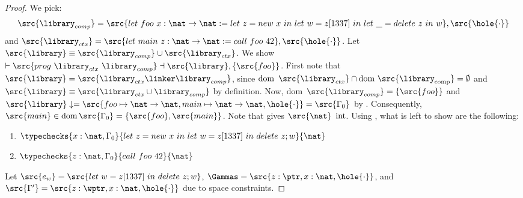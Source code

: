 \documentclass[a4paper,names,dvipsnames]{article}
\begin{document}
\label{thm:lms:notspatmemsafe}
\begin{proof}
  We pick:
  $$\src{\library_{comp}} = \src{let\ foo\ x:\nat\to\nat:=let\ z=new\ x\ in\ let\ w = z[1337]\ in\ let\ \_ = delete\ z\ in\ w},\src{\hole{\cdot}}$$
  and
  $
  \src{\library_{ctx}} = \src{let\ main\ z:\nat\to\nat:=call\ foo\ 42},\src{\hole{\cdot}}
  $.
  Let $\src{\library} \equiv \src{\library_{comp}}\cup\src{\library_{ctx}}$.
  We show $\vdash\src{prog\ \library_{ctx}\ \library_{comp}}\dashv\src{\library},\left\{\src{foo}\right\}$.
  First note that $\src{\library}=\src{\library_{ctx}\linker\library_{comp}}$, since $\operatorname{dom}\ \src{\library_{ctx}}\cap\operatorname{dom\ \src{\library_{comp}}}=\emptyset$ and $\src{\library}\equiv\src{\library_{ctx}\cup\library_{comp}}$ by definition.
  Now, $\operatorname{dom}\ \src{\library_{comp}}=\left\{\src{foo}\right\}$ and $\src{\library}\downarrow=\src{foo\mapsto\nat\to\nat,main\mapsto\nat\to\nat,\hole{\cdot}}=\src{\Gamma_{0}}$ by .
  Consequently, $\src{main}\in\operatorname{dom}\src{\Gamma_{0}}=\left\{\src{foo},\src{main}\right\}$.
  Note that  gives $\src{\nat}\ \operatorname{int}$.
  Using , what is left to show are the following:
  \begin{enumerate}
    \item $\typechecks{x:\nat,\Gamma_{0}}{let\ z=new\ x\ in\ let\ w = z[1337]\ in\ delete\ z; w}{\nat}$
    \item $\typechecks{z:\nat,\Gamma_{0}}{call\ foo\ 42}{\nat}$
  \end{enumerate}

  Let $\src{e_w}=\src{let\ w=z[1337]\ in\ delete\ z; w}$, $\Gammas=\src{z:\ptr,x:\nat,\hole{\cdot}}$, and $\src{\Gamma'}=\src{z:\wptr,x:\nat,\hole{\cdot}}$ due to space constraints.

  \bigskip
  \noindent{}
  \bigskip


\end{proof}
\end{document}
